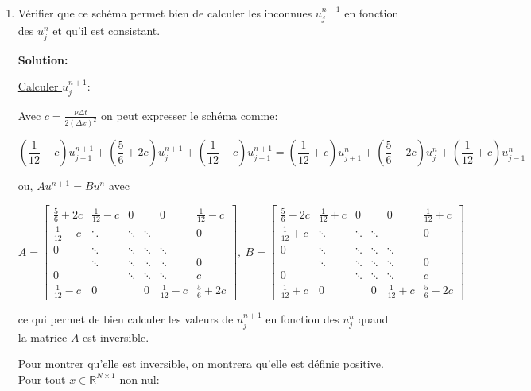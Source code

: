 \documentclass[10pt,a4paper,oneside]{article}
\begin{document}
\begin{enumerate}

\item
Vérifier que ce schéma permet bien de calculer les inconnues $u^{n + 1}_j$ en fonction des $u^n_j$ et qu'il est consistant.

\textbf{Solution:}

\underline{Calculer $u^{n + 1}_j$}:

Avec $c = \frac{\nu \Delta t}{2(\Delta x)^2}$ on peut expresser le schéma comme:

\[ \left(\frac{1}{12} - c\right) u^{n + 1}_{j + 1} + \left(\frac{5}{6} + 2c\right) u^{n + 1}_j + \left(\frac{1}{12} - c\right) u^{n + 1}_{j - 1} = \left(\frac{1}{12} + c\right)u^n_{j + 1} + \left(\frac{5}{6} - 2c\right)u^n_j + \left(\frac{1}{12} + c\right)u^n_{j - 1} \]

ou, $Au^{n + 1} = Bu^n$ avec

$A = \begin{bmatrix}
\frac{5}{6} + 2c  & \frac{1}{12} - c     & 0      &        & 0     & \frac{1}{12} - c  \\
\frac{1}{12} - c  & \ddots & \ddots & \ddots &        & 0 \\
0 & \ddots & \ddots & \ddots & \ddots &    \\
   & \ddots & \ddots & \ddots & \ddots & 0  \\
0  &        & \ddots & \ddots & \ddots & c \\
\frac{1}{12} - c & 0      &        & 0     & \frac{1}{12} - c      & \frac{5}{6} + 2c
\end{bmatrix},\ B = \begin{bmatrix}
\frac{5}{6} - 2c  & \frac{1}{12} + c     & 0      &        & 0     & \frac{1}{12} + c  \\
\frac{1}{12} + c  & \ddots & \ddots & \ddots &        & 0 \\
0 & \ddots & \ddots & \ddots & \ddots &    \\
   & \ddots & \ddots & \ddots & \ddots & 0  \\
0  &        & \ddots & \ddots & \ddots & c \\
\frac{1}{12} + c & 0      &        & 0     & \frac{1}{12} + c      & \frac{5}{6} - 2c
\end{bmatrix}$

ce qui permet de bien calculer les valeurs de $u^{n + 1}_j$ en fonction des $u^n_j$ quand la matrice $A$ est inversible.

Pour montrer qu'elle est inversible, on montrera qu'elle est définie positive. Pour tout $x \in \mathbb{R}^{N \times 1}$ non nul:


\end{enumerate}
\end{document}
